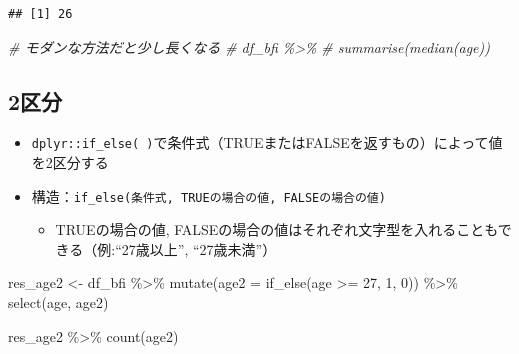 \documentclass[
  xelatex,ja=standard, b5paper]{bxjsbook}
\newenvironment{Shaded}{\begin{snugshade}}{\end{snugshade}}
\newcommand{\AttributeTok}[1]{\textcolor[rgb]{0.77,0.63,0.00}{#1}}
\newcommand{\CommentTok}[1]{\textcolor[rgb]{0.56,0.35,0.01}{\textit{#1}}}
\newcommand{\DecValTok}[1]{\textcolor[rgb]{0.00,0.00,0.81}{#1}}
\newcommand{\FunctionTok}[1]{\textcolor[rgb]{0.00,0.00,0.00}{#1}}
\newcommand{\NormalTok}[1]{#1}
\newcommand{\OtherTok}[1]{\textcolor[rgb]{0.56,0.35,0.01}{#1}}
\newcommand{\SpecialCharTok}[1]{\textcolor[rgb]{0.00,0.00,0.00}{#1}}
\providecommand{\tightlist}{%
  \setlength{\itemsep}{0pt}\setlength{\parskip}{0pt}}
\begin{document}
\begin{Shaded}
\end{Shaded}

\begin{verbatim}
## [1] 26
\end{verbatim}

\begin{Shaded}
\begin{Highlighting}[]
\CommentTok{\# モダンな方法だと少し長くなる}
\CommentTok{\# df\_bfi \%\textgreater{}\% }
\CommentTok{\#   summarise(median(age))}
\end{Highlighting}
\end{Shaded}

\hypertarget{ux533aux5206}{%
\subsection{2区分}\label{ux533aux5206}}

\begin{itemize}
\tightlist
\item
  \texttt{dplyr::if\_else(\ )}で条件式（TRUEまたはFALSEを返すもの）によって値を2区分する
\item
  構造：\texttt{if\_else(条件式,\ TRUEの場合の値,\ FALSEの場合の値)}

  \begin{itemize}
  \tightlist
  \item
    TRUEの場合の値, FALSEの場合の値はそれぞれ文字型を入れることもできる（例:``27歳以上'', ``27歳未満''）
  \end{itemize}
\end{itemize}

\begin{Shaded}
\begin{Highlighting}[]
\NormalTok{res\_age2 }\OtherTok{\textless{}{-}} 
\NormalTok{  df\_bfi }\SpecialCharTok{\%\textgreater{}\%} 
  \FunctionTok{mutate}\NormalTok{(}\AttributeTok{age2 =} \FunctionTok{if\_else}\NormalTok{(age }\SpecialCharTok{\textgreater{}=} \DecValTok{27}\NormalTok{, }\DecValTok{1}\NormalTok{, }\DecValTok{0}\NormalTok{)) }\SpecialCharTok{\%\textgreater{}\%} 
  \FunctionTok{select}\NormalTok{(age, age2)}

\NormalTok{res\_age2 }\SpecialCharTok{\%\textgreater{}\%} \FunctionTok{count}\NormalTok{(age2) }
\end{Highlighting}
\end{Shaded}
\end{document}
